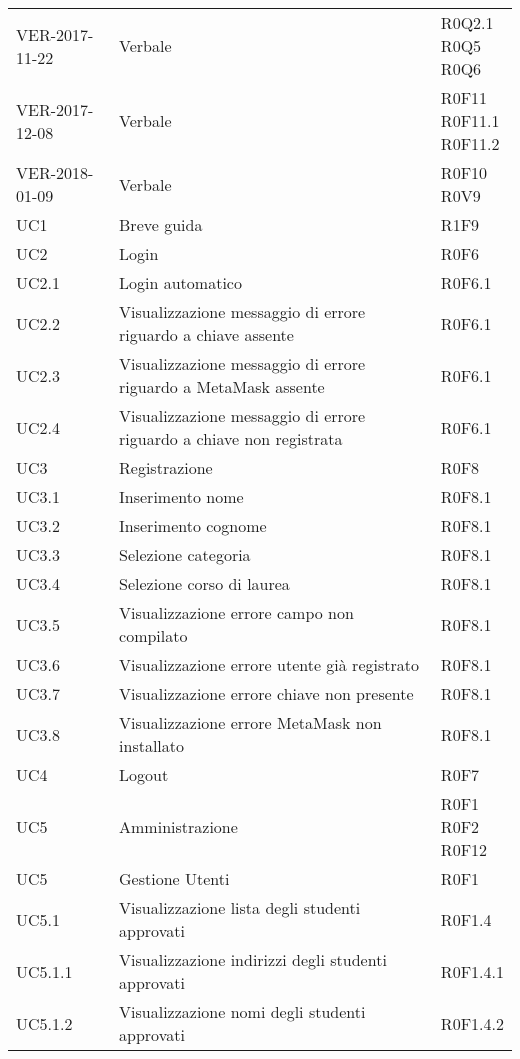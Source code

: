 \documentclass[AnalisiDeiRequisiti.tex]{subfiles}
\begin{document}
\begin{longtable}[H]{p{2cm}p{5cm}p{5cm}}
	VER-2017-11-22 & Verbale & \makecell[tl]{ R0Q2.1 \\
	 R0Q5 \\
	 R0Q6 } \\
	
	VER-2017-12-08 & Verbale & \makecell[tl]{ R0F11 \\
	 R0F11.1 \\
	 R0F11.2 } \\
	VER-2018-01-09 & Verbale & \makecell[tl]{ R0F10 \\
	R0V9 } \\ 
	
	UC1 & Breve guida & R1F9 \\
	UC2 & Login & R0F6 \\
	UC2.1 & Login automatico & R0F6.1 \\
	UC2.2 & Visualizzazione messaggio di errore riguardo a chiave assente & R0F6.1 \\
	UC2.3 & Visualizzazione messaggio di errore riguardo a MetaMask assente & R0F6.1 \\
	UC2.4 & Visualizzazione messaggio di errore riguardo a chiave non registrata & R0F6.1 \\
	UC3 & Registrazione & R0F8 \\
	UC3.1 & Inserimento nome & R0F8.1 \\
	UC3.2 & Inserimento cognome & R0F8.1 \\
	UC3.3 & Selezione categoria & R0F8.1 \\
	UC3.4 & Selezione corso di laurea & R0F8.1 \\
	UC3.5 & Visualizzazione errore campo non compilato & R0F8.1 \\
	UC3.6 & Visualizzazione errore utente già registrato & R0F8.1 \\
	UC3.7 & Visualizzazione errore chiave non presente & R0F8.1 \\
	UC3.8 & Visualizzazione errore MetaMask non installato & R0F8.1 \\
	UC4 & Logout & R0F7 \\
	UC5 & Amministrazione & \makecell[tl]{ R0F1 \\
		R0F2 \\
		R0F12 } \\
	UC5 & Gestione Utenti & R0F1 \\
	UC5.1 & Visualizzazione lista degli studenti approvati & R0F1.4 \\
	UC5.1.1 & Visualizzazione indirizzi degli studenti approvati & R0F1.4.1 \\
	UC5.1.2 & Visualizzazione nomi degli studenti approvati & R0F1.4.2 \\

\end{longtable}
\end{document}
